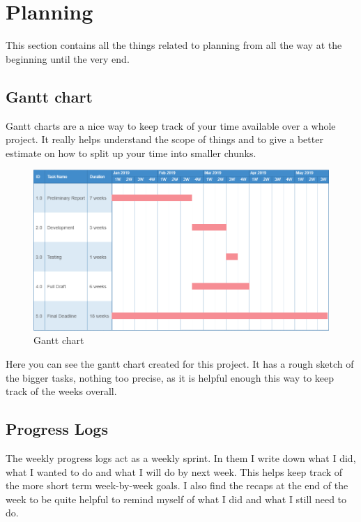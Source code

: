 
\chapter{Planning}

\label{Chapter3}

This section contains all the things related to planning from all the way at the beginning until the very end.

\section{Gantt chart}
Gantt charts are a nice way to keep track of your time available over a whole project. It really helps understand the scope of things and to give a better estimate on how to split up your time into smaller chunks.
\begin{figure}[!h]
	\includegraphics[width=150mm]{figures/gantt_chart}
	\caption{Gantt chart}
\end{figure}

Here you can see the gantt chart created for this project. It has a rough sketch of the bigger tasks, nothing too precise, as it is helpful enough this way to keep track of the weeks overall.

\section{Progress Logs}
The weekly progress logs act as a weekly sprint. In them I write down what I did, what I wanted to do and what I will do by next week. This helps keep track of the more short term week-by-week goals. I also find the recaps at the end of the week to be quite helpful to remind myself of what I did and what I still need to do. 

